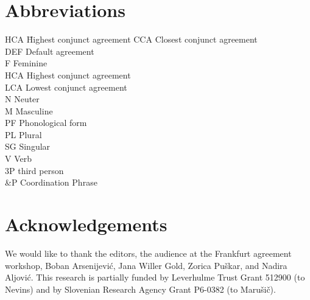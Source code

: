 \documentclass[output=paper
,modfonts
,nonflat]{langsci/langscibook}
\begin{document}

\section*{Abbreviations}

\begin{multicols}{2}
	\begin{tabbing}
		{HCA}\hspace{2\tabcolsep} \= Highest conjunct agreement\kill
CCA \> Closest conjunct agreement\\
DEF \> Default agreement\\
F \> Feminine\\
HCA \> Highest conjunct agreement\\
LCA \> Lowest conjunct agreement\\
N \> Neuter\\
M \> Masculine\\
PF \> Phonological form\\
PL \> Plural\\
SG \> Singular\\
V \> Verb\\
3P \> third person\\
\&P \> Coordination Phrase
	\end{tabbing} 
\end{multicols}

\section*{Acknowledgements}
We would like to thank the editors, the audience at the Frankfurt agreement workshop, Boban Arsenijević, Jana Willer Gold, Zorica Puškar, and Nadira Aljović. This research is partially funded by Leverhulme Trust Grant 512900 (to Nevins) and by Slovenian Research Agency Grant P6-0382 (to Marušič). 


{\sloppy\printbibliography[heading=subbibliography,notkeyword=this]}
\end{document}

